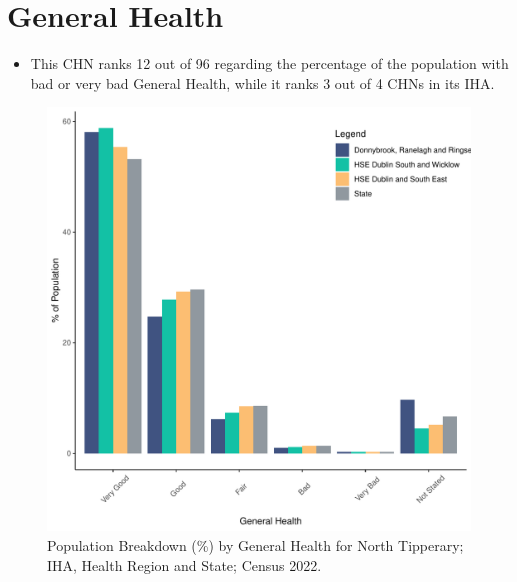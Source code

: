 \documentclass{article}
\begin{document}
\pagebreak

\section{General Health}\label{sect:GenHealth}
\begin{itemize}
\item  This CHN ranks  12 out of 96 regarding the percentage of the population with bad or very bad General Health, while it ranks   3 out of 4 CHNs in its IHA.
\end{itemize}
\begin{figure}[h]
	\centering
	\includegraphics[width = 150mm]{../figures/GenED.pdf}
	\caption{Population Breakdown (\%) by General Health for North Tipperary; IHA, Health Region and State;  Census 2022.}
	\label{fig:2ae19629-1a6a-13a3-e055-000000000001}
	\end{figure}
\end{document}
